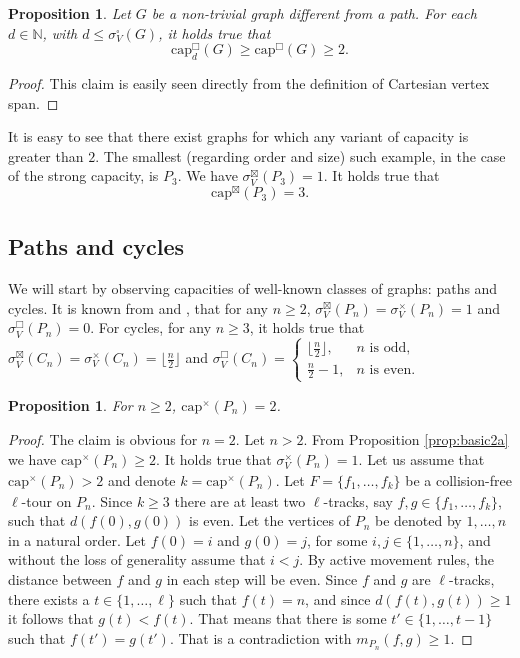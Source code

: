 \documentclass{article}
\newtheorem{proposition}[theorem]{Proposition}
\newcommand{\dcap}[2]{\mathrm{cap}^{\times}_{#1}(#2)}
\newcommand{\scap}[2]{\mathrm{cap}^{\boxtimes}_{#1}(#2)}
\newcommand{\ccap}[2]{\mathrm{cap}^{\mathbin{\Box}}_{#1}(#2)}
\DeclareMathOperator{\BoxProduct}{\mathbin{\Box}}
\newcommand{\svSpan}[1]{\sigma^{\boxtimes}_V(#1)}
\newcommand{\dvSpan}[1]{\sigma^{\times}_V(#1)}
\newcommand{\cvSpan}[1]{\sigma^{\BoxProduct}_V(#1)}
\begin{document}
\begin{proposition}\label{prop:basic2b}
    Let $G$ be a non-trivial graph different from a path. For each $d\in\mathbb{N}$, with $d\leq\sigma^\square_V(G)$, it holds true that
    $$\ccap{d}{G}\geq \ccap{}{G}\geq 2.$$
\end{proposition}

\begin{proof}
    This claim is easily seen directly from the definition of Cartesian vertex span.
\end{proof}

It is easy to see that there exist graphs for which any variant of capacity is greater than $2$. The smallest (regarding order and size) such example, in the case of the strong capacity, is $P_3$. We have $\sigma^\boxtimes_V(P_3)=1$. It holds true that
$$\scap{}{P_3}=3.$$

\subsection{Paths and cycles}

We will start by observing capacities of well-known classes of graphs: paths and cycles. It is known from \cite{BaTa23} and \cite{Erceg23}, that for any $n\geq2$, $\svSpan{P_n}=\dvSpan{P_n}=1$ and $\cvSpan{P_n}=0$. For cycles, for any $n\geq 3$, it holds true that $\svSpan{C_n}=\dvSpan{C_n}=\lfloor\frac{n}{2}\rfloor$ and 
$\cvSpan{C_n}=\begin{cases}
 \lfloor\frac{n}{2}\rfloor, & n \text{ is odd,} \\
     \frac{n}{2}-1, & n \text{ is even.}
\end{cases}$


\begin{proposition}\label{prop:direct-path}
    For $n\geq 2$, $\dcap{}{P_n}=2$. 
\end{proposition}
\begin{proof}
    The claim is obvious for $n=2$.
    Let $n>2$. From Proposition \ref{prop:basic2a} we have $\dcap{}{P_n}\geq 2$. It holds true that $\sigma^\times_V(P_n)=1$. Let us assume that $\dcap{}{P_n}>2$ and denote $k=\dcap{}{P_n}$.    
    Let $F=\{f_1,\ldots,f_k\}$ be a collision-free $\ell$-tour on $P_n$. Since $k\geq 3$ there are at least two $\ell$-tracks, say $f,g\in\{f_1,\ldots,f_k\}$, such that $d(f(0),g(0))$ is even. Let the vertices of $P_n$ be denoted by $1,\ldots,n$ in a natural order. Let $f(0)=i$ and $g(0)=j$, for some $i,j\in\{1,\ldots,n\}$, and without the loss of generality assume that $i<j$. By active movement rules, the distance between $f$ and $g$ in each step will be even. Since $f$ and $g$ are $\ell$-tracks, there exists a $t\in\{1,\ldots,\ell\}$ such that $f(t)=n$, and since $d(f(t),g(t))\geq1$ it follows that $g(t)<f(t)$. That means that there is some $t'\in\{1,\ldots,t-1\}$ such that $f(t')=g(t')$. That is a contradiction with $m_{P_n}(f,g)\geq 1$.
\end{proof}
\end{document}
